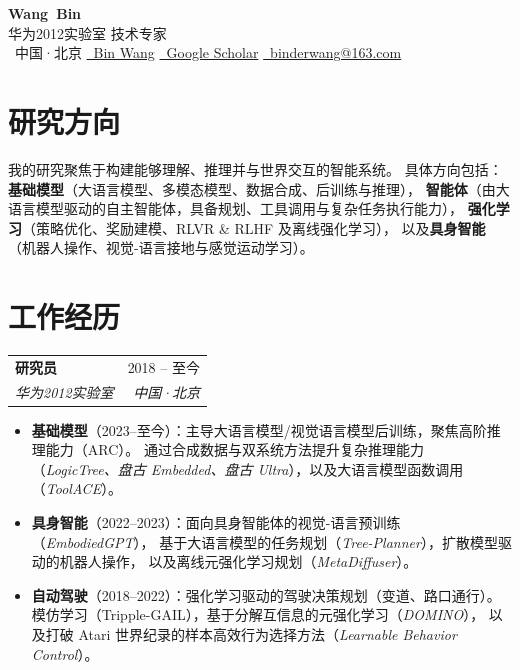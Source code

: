 \documentclass[10pt, a4paper]{article}
\makeatletter
\newcommand{\cventry}[4]{%
  \begin{tabular*}{\linewidth}{@{}l@{\extracolsep{\fill}}r@{}}
    \textbf{#1} & {#4} \\[-0.1em]
    \textit{\small #2} & \textit{\small #3}
  \end{tabular*}%
  \vspace{0.1em}%
}
\makeatother
\begin{document}
\pagestyle{empty}

\begin{center}
  {\LARGE\bfseries Wang\ Bin}\\[0.35em]
  {\small 华为2012实验室 技术专家}\\[0.45em]
  {\small
    \faMapMarker*\ 中国·北京\quad
    \href{https://www.linkedin.com/in/bin-wang-85a164147/}{\faLinkedin\ Bin Wang}\quad
    \href{https://scholar.google.com/citations?user=KWZG_YsAAAAJ&hl=en}{\faGraduationCap\ Google Scholar}\quad
    \href{mailto:binderwang@163.com}{\faEnvelope\ binderwang@163.com}
  }
\end{center}
\vspace{0.3em}

\section{研究方向}
{\small
我的研究聚焦于构建能够理解、推理并与世界交互的智能系统。
具体方向包括：\textbf{基础模型}（大语言模型、多模态模型、数据合成、后训练与推理），
\textbf{智能体}（由大语言模型驱动的自主智能体，具备规划、工具调用与复杂任务执行能力），
\textbf{强化学习}（策略优化、奖励建模、RLVR \& RLHF 及离线强化学习），
以及\textbf{具身智能}（机器人操作、视觉-语言接地与感觉运动学习）。
}

\section{工作经历}

\cventry{研究员}{华为2012实验室}{中国·北京}{2018 -- 至今}
\begin{itemize}[leftmargin=1.5em, itemsep=0.1em, topsep=0.15em, parsep=0pt, label=\textbullet]
  \item {\small \textbf{基础模型}（2023--至今）：主导大语言模型/视觉语言模型后训练，聚焦高阶推理能力（ARC）。
    通过合成数据与双系统方法提升复杂推理能力
    （\textit{LogicTree、盘古 Embedded、盘古 Ultra}），以及大语言模型函数调用（\textit{ToolACE}）。}
  \item {\small \textbf{具身智能}（2022--2023）：面向具身智能体的视觉-语言预训练（\textit{EmbodiedGPT}），
    基于大语言模型的任务规划（\textit{Tree-Planner}），扩散模型驱动的机器人操作，
    以及离线元强化学习规划（\textit{MetaDiffuser}）。}
  \item {\small \textbf{自动驾驶}（2018--2022）：强化学习驱动的驾驶决策规划（变道、路口通行）。
    模仿学习（Tripple-GAIL），基于分解互信息的元强化学习（\textit{DOMINO}），
    以及打破 Atari 世界纪录的样本高效行为选择方法（\textit{Learnable Behavior Control}）。}
\end{itemize}
\end{document}

